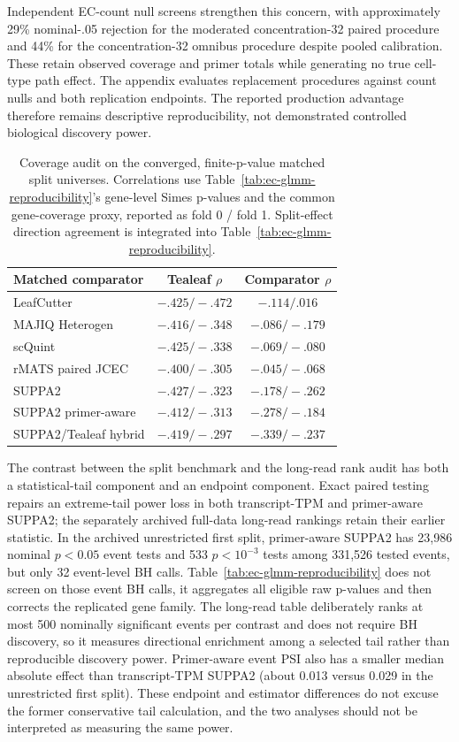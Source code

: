 \documentclass[11pt]{article}
\begin{document}
Independent EC-count null screens strengthen this concern, with approximately 29\% nominal-.05 rejection for the moderated concentration-32 paired procedure and 44\% for the concentration-32 omnibus procedure despite pooled calibration. These retain observed coverage and primer totals while generating no true cell-type path effect. The appendix evaluates replacement procedures against count nulls and both replication endpoints. The reported production advantage therefore remains descriptive reproducibility, not demonstrated controlled biological discovery power.

\begin{table}[H]
\centering
\scriptsize
\caption{Coverage audit on the converged, finite-p-value matched split universes. Correlations use Table~\ref{tab:ec-glmm-reproducibility}'s gene-level Simes p-values and the common gene-coverage proxy, reported as fold 0 / fold 1. Split-effect direction agreement is integrated into Table~\ref{tab:ec-glmm-reproducibility}.}
\label{tab:coverage-direction-audit}
\begin{tabular}{lcc}
\toprule
Matched comparator & Tealeaf \(\rho\) & Comparator \(\rho\)\\
\midrule
LeafCutter & \(-.425 / -.472\) & \(-.114 / .016\)\\
MAJIQ Heterogen & \(-.416 / -.348\) & \(-.086 / -.179\)\\
scQuint & \(-.425 / -.338\) & \(-.069 / -.080\)\\
rMATS paired JCEC & \(-.400 / -.305\) & \(-.045 / -.068\)\\
SUPPA2 & \(-.427 / -.323\) & \(-.178 / -.262\)\\
SUPPA2 primer-aware & \(-.412 / -.313\) & \(-.278 / -.184\)\\
SUPPA2/Tealeaf hybrid & \(-.419 / -.297\) & \(-.339 / -.237\)\\
\bottomrule
\end{tabular}
\end{table}


The contrast between the split benchmark and the long-read rank audit has both a statistical-tail component and an endpoint component. Exact paired testing repairs an extreme-tail power loss in both transcript-TPM and primer-aware SUPPA2; the separately archived full-data long-read rankings retain their earlier statistic. In the archived unrestricted first split, primer-aware SUPPA2 has 23,986 nominal \(p<0.05\) event tests and 533 \(p<10^{-3}\) tests among 331,526 tested events, but only 32 event-level BH calls. Table~\ref{tab:ec-glmm-reproducibility} does not screen on those event BH calls, it aggregates all eligible raw p-values and then corrects the replicated gene family. The long-read table deliberately ranks at most 500 nominally significant events per contrast and does not require BH discovery, so it measures directional enrichment among a selected tail rather than reproducible discovery power. Primer-aware event PSI also has a smaller median absolute effect than transcript-TPM SUPPA2 (about 0.013 versus 0.029 in the unrestricted first split). These endpoint and estimator differences do not excuse the former conservative tail calculation, and the two analyses should not be interpreted as measuring the same power.
\end{document}
